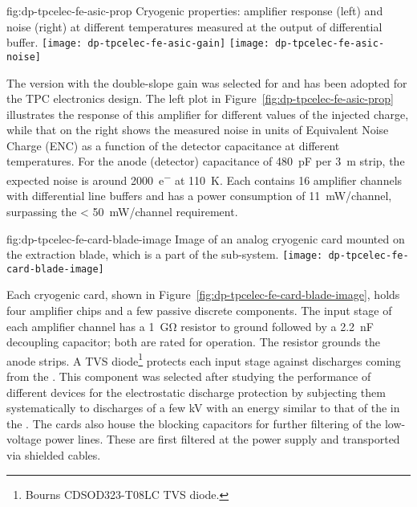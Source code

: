 \begin{dunefigure}{fig:dp-tpcelec-fe-asic-prop}
{Cryogenic   properties: amplifier response (left) and noise (right) at different temperatures measured at the output of differential buffer.}
\texttt{[image: dp-tpcelec-fe-asic-gain]}
\texttt{[image: dp-tpcelec-fe-asic-noise]}
\end{dunefigure}

The  version with the double-slope gain was selected for  and has been adopted for the \dual TPC electronics design. The left plot in Figure~\ref{fig:dp-tpcelec-fe-asic-prop} illustrates the response of this amplifier for different values of the injected charge, while that on the right shows the measured noise in units of Equivalent Noise Charge (ENC) as a function of the detector capacitance at different temperatures. For the  anode (detector) capacitance of \SI{480}{\pico\farad} per \SI{3}{\metre} strip, the expected noise is around \SI{2000}{e^{-}} at \SI{110}{\kelvin}. Each  contains \num{16} amplifier channels with differential line buffers and has a power consumption of \SI{11}{\milli\watt/channel}, surpassing the \SI{< 50}{\milli\watt/channel} requirement. 

\begin{dunefigure}{fig:dp-tpcelec-fe-card-blade-image}
{Image of an analog cryogenic  card mounted on the extraction blade, which is a part of the  sub-system.}
\texttt{[image: dp-tpcelec-fe-card-blade-image]}
\end{dunefigure}

Each cryogenic  card, shown in Figure~\ref{fig:dp-tpcelec-fe-card-blade-image}, holds four  amplifier chips and a few passive discrete components. The input stage of each amplifier channel has a \SI{1}{\giga\ohm} resistor to ground followed by a \SI{2.2}{\nano\farad} decoupling capacitor; both are rated for  operation. The %
resistor grounds the  anode strips. A TVS diode\footnote{Bourns\texttrademark{} CDSOD323-T08LC TVS diode.} protects each input stage against discharges coming from the . This component was selected after studying the performance of different devices for the electrostatic discharge protection by subjecting them systematically to discharges of a few \si{kV} with an energy similar to that of the  in the . The  cards also house the blocking capacitors for further filtering of the low-voltage power lines. These are first filtered at the power supply and transported via shielded cables.

